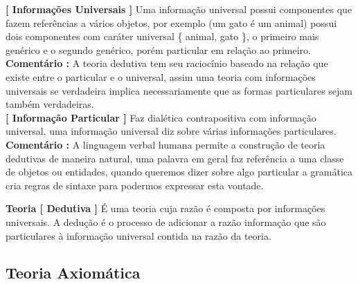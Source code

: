 \documentclass[10pt,a4paper]{report}
\begin{document}
\textbf{[ Informações Universais ]} Uma informação universal possui componentes que fazem referências a vários objetos, por exemplo (um gato é um animal) possui dois componentes com caráter universal \{ animal, gato \}, o primeiro mais genérico e o segundo genérico, porém particular em relação ao primeiro.\\

\textbf{Comentário :} A teoria dedutiva tem seu raciocínio baseado na relação que existe entre o particular e o universal, assim uma teoria com informações universais se verdadeira implica necessariamente que as formas particulares sejam também verdadeiras.\\

\textbf{[ Informação Particular ]} Faz dialética contrapositiva com informação universal, uma informação universal diz sobre várias informações particulares.\\

\textbf{Comentário :} A linguagem verbal humana permite a construção de teoria dedutivas de maneira natural, uma palavra em geral faz referência a uma classe de objetos ou entidades, quando queremos dizer sobre algo particular a gramática cria regras de sintaxe para podermos expressar esta vontade.




\hspace{\baselineskip}

\textbf{Teoria [ Dedutiva ]} É uma teoria cuja razão é composta por informações universais. A dedução é o processo de adicionar a razão informação que são particulares à informação universal contida na razão da teoria. %



\subsection{Teoria Axiomática}
\end{document}
